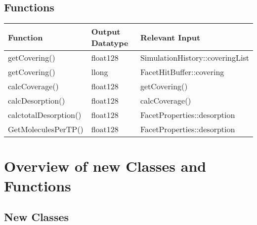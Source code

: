 \section{Functions}
\begin{center}
\begin{tabular}{|l|l|l|}
\hline
Function&Output Datatype&Relevant Input\\
\hline
getCovering()&float128&SimulationHistory::coveringList\\
getCovering()&llong&FacetHitBuffer::covering\\
calcCoverage()&float128&getCovering()\\
calcDesorption()&float128&calcCoverage()\\
calctotalDesorption()&float128&FacetProperties::desorption\\
GetMoleculesPerTP()&float128&FacetProperties::desorption\\
\hline
\end{tabular}
\end{center}

\chapter{Overview of new Classes and Functions}

\section{New Classes}


